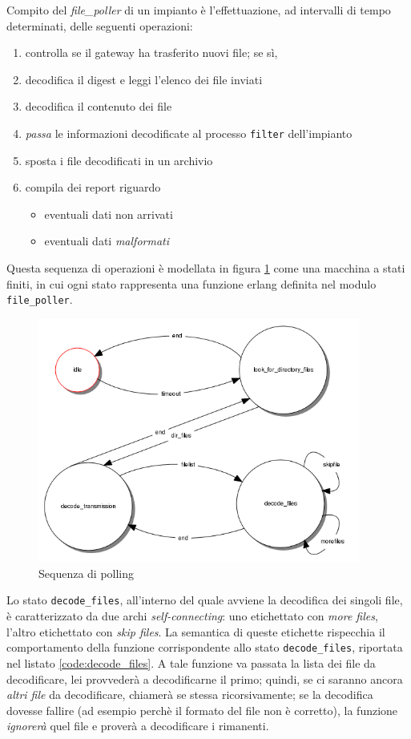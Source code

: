 %
Compito del \emph{file\_poller} di un impianto \`e l'effettuazione, ad intervalli di tempo
determinati, delle seguenti operazioni:
%
\begin{enumerate}
\item controlla se il gateway ha trasferito nuovi file; se s\`i,
\item decodifica il digest e leggi l'elenco dei file inviati
\item decodifica il contenuto dei file
\item \emph{passa} le informazioni decodificate al processo \texttt{filter} dell'impianto
\item sposta i file decodificati in un archivio
\item compila dei report riguardo
      \begin{itemize}
      \item eventuali dati non arrivati
      \item eventuali dati \emph{malformati}
      \end{itemize}
\end{enumerate}
%
Questa sequenza di operazioni \`e modellata in figura \ref{fig:polling-sequence} come una
macchina a stati finiti, in cui ogni stato rappresenta una funzione erlang definita nel 
modulo \texttt{file\_poller}.
%
\begin{figure}[!h]
\centering
\includegraphics[width=300pt]{img/file-poller.png}
\caption{Sequenza di polling}
\label{fig:polling-sequence}
\end{figure}
%

%
Lo stato \texttt{decode\_files}, all'interno del quale avviene la decodifica dei singoli file,
\`e caratterizzato da due archi \emph{self-connecting}: uno etichettato con \emph{more files}, 
l'altro etichettato con \emph{skip files}.
%
La semantica di queste etichette rispecchia il comportamento della funzione corrispondente 
allo stato \texttt{decode\_files}, riportata nel listato \ref{code:decode_files}. A tale funzione 
va passata la lista dei file da decodificare, lei provveder\`a a decodificarne il primo; quindi, 
se ci saranno ancora \emph{altri file} da decodificare, chiamer\`a se stessa ricorsivamente; 
se la decodifica dovesse fallire (ad esempio perch\`e il formato del file non \`e corretto), 
la funzione \emph{ignorer\`a} quel file e prover\`a a decodificare i rimanenti.
%

